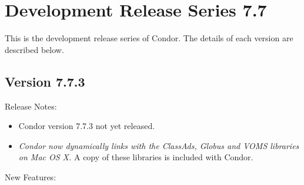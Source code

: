 
\section{\label{sec:History-7-7}Development Release Series 7.7}

This is the development release series of Condor.
The details of each version are described below.


\subsection*{\label{sec:New-7-7-3}Version 7.7.3}

\noindent Release Notes:

\begin{itemize}

\item Condor version 7.7.3 not yet released.

\item
\emph{Condor now dynamically links with the ClassAds, Globus and VOMS
libraries on Mac OS X.}
A copy of these libraries is included with Condor.

\end{itemize}


\noindent New Features:

